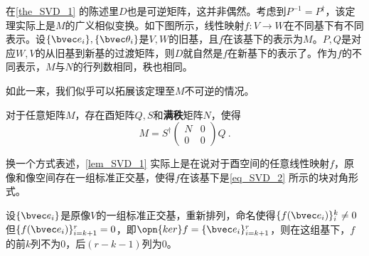 在\autoref{the_SVD_1} 的陈述里$D$也是可逆矩阵，这并非偶然。考虑到$P^{-1}=P^{\dagger}$，该定理实际上是$M$的广义相似变换。如下图所示，线性映射$f:V\rightarrow W$在不同基下有不同表示。设$\{\bvec e_i\},\{\bvec \theta_i\}$是$V,W$的旧基，且$f$在该基下的表示为$M$。$P,Q$是对应$W,V$的从旧基到新基的过渡矩阵，则$D$就自然是$f$在新基下的表示了。作为$f$的不同表示，$M$与$N$的行列数相同，秩也相同。

如此一来，我们似乎可以拓展该定理至$M$不可逆的情况。

\begin{lemma}{}\label{lem_SVD_1}
对于任意矩阵$M$，存在酉矩阵$Q,S$和\textbf{满秩}矩阵$N$，使得
\begin{equation}\label{eq_SVD_2}
M=S^{\dagger}\left(\begin{array}{cc}
N & 0 \\
0 & 0
\end{array}\right) Q~.
\end{equation}
\end{lemma}


换一个方式表述，\autoref{lem_SVD_1} 实际上是在说对于酉空间的任意线性映射$f$，原像和像空间存在一组标准正交基，使得$f$在该基下是\autoref{eq_SVD_2} 所示的块对角形式。

设$\{\bvec e_i\}$是原像$V$的一组标准正交基，重新排列，命名使得$\{f(\bvec e_i)\}_i^k\neq 0$但$\{f(\bvec e_i)\}_{i=k+1}^r=0$，即$\opn{ker} f=\{\bvec e_i\}_{i=k+1}^r$，则在这组基下，$f$的前$k$列不为0，后$(r-k-1)$列为$0$。
















